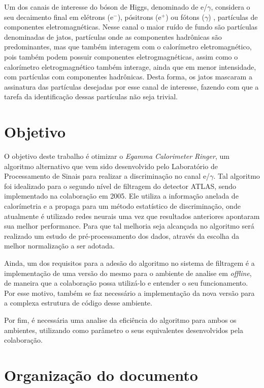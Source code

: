 Um dos canais de interesse do bóson de Higgs, denominado de e/$\gamma$,
considera o seu decaimento final em elétrons (e$^-$), pósitrons (e$^+$) ou fótons ($\gamma$)
, partículas de componentes eletromagnéticas. Nesse canal o maior ruído de fundo são
partículas denominadas de jatos, partículas onde as componentes hadrônicas são
predominantes, mas que também interagem com o calorímetro eletromagnético, pois
também podem possuir componentes eletrogmagnéticas, assim como o
calorímetro eletrogmagnético também interage, ainda que em menor intensidade,
com partículas com componentes hadrônicas. Desta forma, os jatos mascaram a assinatura
das partículas desejadas por esse canal de interesse, fazendo com que a tarefa
da identificação dessas partículas não seja trivial.


\section{Objetivo} %

O objetivo deste trabalho é otimizar o \emph{Egamma Calorimeter Ringer},
um algoritmo alternativo que vem sido desenvolvido pelo Laboratório 
de Processamento de Sinais para realizar a discriminação 
no canal e/$\gamma$. Tal algoritmo foi idealizado para o segundo
nível de filtragem do detector ATLAS, sendo implementado na colaboração em 2005.
Ele utiliza a informação anelada de calorímetria e a propaga para um método estatístico 
de discriminação, onde atualmente é utilizado redes neurais uma vez que resultados anteriores 
apontaram sua melhor performance. Para que tal melhoria seja alcançada no
algoritmo será realizado um estudo de pré-processamento dos dados,
através da escolha da melhor normalização a ser adotada.

Ainda, um dos requisitos para a adesão do algoritmo no sistema de filtragem é a
implementação de uma versão do mesmo para o ambiente de analise em {\it
offline}, de maneira  que a colaboração possa utilizá-lo e entender o seu
funcionamento. Por esse motivo, também se faz necessário a implementação 
da nova versão para a complexa estrutura de código desse ambiente.

Por fim, é necessária uma analise da eficiência do algoritmo para ambos os
ambientes, utilizando como parâmetro o seus equivalentes desenvolvidos pela colaboração.

\section{Organização do documento} %

